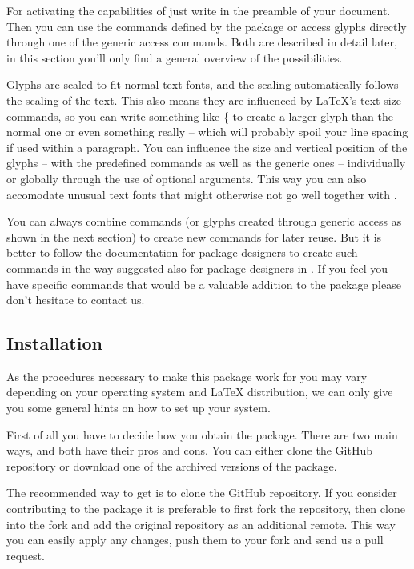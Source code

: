 \documentclass{article}
\begin{document}
\bigskip
For activating the capabilities of \lilyglyphs just write  in the preamble of your document. 
Then you can use the commands defined by the package or access glyphs directly through one of the generic access commands.
Both are described in detail later, in this section you'll only find a general overview of the possibilities.

Glyphs are scaled to fit normal text fonts, and the scaling automatically follows the scaling of the text. 
This also means they are influenced by \LaTeX 's text size commands, so you can write something like \{ to create a larger {\Large \flat}glyph than the normal \flat one or even something really  {\Huge {}} -- which will probably spoil your line spacing if used within a paragraph. 
You can influence the size and vertical position of the glyphs -- with the predefined commands as well as the generic ones -- individually or globally through the use of optional arguments.
This way you can also accomodate unusual text fonts that might otherwise not go well together with \lilyglyphs*.

You can always combine commands (or glyphs created through generic access as shown in the next section) to create new commands for later reuse. 
But it is better to follow the documentation for package designers to create such commands in the way suggested also for package designers in .
If you feel you have specific commands that would be a valuable addition to the package please don't hesitate to contact us.

\subsection{Installation}
\label{subsec:installation}
As the procedures necessary to make this package work for you may vary depending on your operating system and \LaTeX{} distribution, we can only give you some general hints on how to set up your system.

First of all you have to decide how you obtain the package.
There are two main ways, and both have their pros and cons.
You can either clone the GitHub repository or download one of the archived versions of the package.

The recommended way to get \lilyglyphs is to clone the GitHub repository.
If you consider contributing to the package it is preferable to first fork the repository, then clone into the fork and add the original repository as an additional remote.
This way you can easily apply any changes, push them to your fork and send us a pull request.
\end{document}
